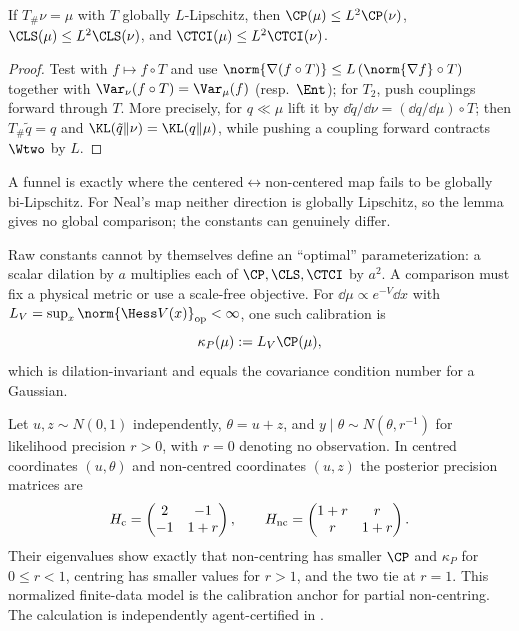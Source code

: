 \documentclass[../../main.tex]{subfiles}
\begin{document}
\begin{lemma}
\label{lem:a5-lipschitz}
If $T_\#\nu=\mu$ with $T$ globally $L$-Lipschitz, then
$\CP(\mu)\le L^2\CP(\nu)$, $\CLS(\mu)\le L^2\CLS(\nu)$, and $\CTCI(\mu)\le L^2\CTCI(\nu)$.
\end{lemma}

\begin{proof}
Test with $f\mapsto f\circ T$ and use $\norm{\nabla(f\circ T)}\le L\,(\norm{\nabla f}\circ T)$
together with $\Var_\nu(f\circ T)=\Var_\mu(f)$ (resp.\ $\Ent$); for $T_2$, push couplings
forward through $T$. More precisely, for $q\ll\mu$ lift it by
$\dd\tilde q/\dd\nu=(\dd q/\dd\mu)\circ T$; then $T_\#\tilde q=q$ and
$\KL(\tilde q\|\nu)=\KL(q\|\mu)$, while pushing a coupling forward contracts $\Wtwo$ by $L$.
\end{proof}

\noindent A funnel is exactly where the centered$\leftrightarrow$non-centered map fails to be
globally bi-Lipschitz. For Neal's map neither direction is globally Lipschitz, so the lemma gives
no global comparison; the constants can genuinely differ.

Raw constants cannot by themselves define an ``optimal'' parameterization: a scalar dilation by
$a$ multiplies each of $\CP,\CLS,\CTCI$ by $a^2$. A comparison must fix a physical metric or use
a scale-free objective. For $\dd\mu\propto e^{-V}\dd x$ with
$L_V=\sup_x\norm{\Hess V(x)}_{\rm op}<\infty$, one such calibration is
\begin{equation}\label{eq:a5-condition}
  \kappa_P(\mu):=L_V\CP(\mu),
\end{equation}
which is dilation-invariant and equals the covariance condition number for a Gaussian.

\begin{example}
\label{ex:a5-gaussian-crossover}
Let $u,z\sim N(0,1)$ independently, $\theta=u+z$, and
$y\mid\theta\sim N(\theta,r^{-1})$ for likelihood precision $r>0$, with $r=0$ denoting no
observation. In centred coordinates $(u,\theta)$ and non-centred
coordinates $(u,z)$ the posterior precision matrices are
\[
 H_{\rm c}=\begin{pmatrix}2&-1\\-1&1+r\end{pmatrix},\qquad
 H_{\rm nc}=\begin{pmatrix}1+r&r\\r&1+r\end{pmatrix}.
\]
Their eigenvalues show exactly that non-centring has smaller $\CP$ and $\kappa_P$ for $0\le r<1$,
centring has smaller values for $r>1$, and the two tie at $r=1$. This normalized finite-data
model is the calibration anchor for partial non-centring. The calculation is independently
agent-certified in .
\end{example}
\end{document}
